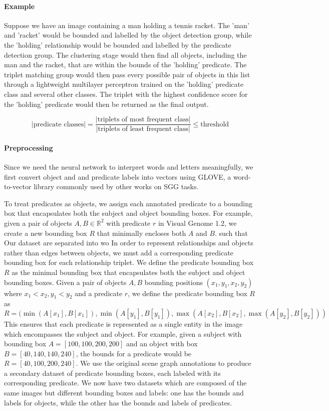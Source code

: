 \documentclass{article}
\begin{document}
\paragraph{Example} Suppose we have an image containing a man holding a tennis racket. The 'man' and 'racket' would be bounded and labelled by the object detection group, while the 'holding' relationship would be bounded and labelled by the predicate detection group. The clustering stage would then find all objects, including the man and the racket, that are within the bounds of the 'holding' predicate. The triplet matching group would then pass every possible pair of objects in this list through a lightweight multilayer perceptron trained on the 'holding' predicate class and several other classes. The triplet with the highest confidence score for the 'holding' predicate would then be returned as the final output.

$$
|\text{predicate classes}| = \frac{|\text{triplets of most frequent class}|}{|\text{triplets of least frequent class}|} \leq \text{threshold}
$$
\paragraph{Preprocessing}
Since we need the neural network to interpret words and letters meaningfully, we first convert object and and predicate labels into vectors using GLOVE\cite{pennington2014glove}, a word-to-vector library commonly used by other works on SGG tasks\cite{lee2018multi}. 

To treat predicates as objects, we assign each annotated predicate to a bounding box that encapsulates both the subject and object bounding boxes. For example, given a pair of objects $A,B \in \mathbb{R}^2$ with predicate $r$ in Visual Genome 1.2, we create a new bounding box $R$ that minimally encloses both $A$ and $B$. such that 
Our dataset are separated into wo
In order to represent relationships and objects rather than edges between objects, we must add a corresponding predicate bounding box for each relationship triplet. We define the predicate bounding box $R$ as the minimal bounding box that encapsulates both the subject and object bounding boxes. Given a pair of objects $A,B$ bounding positions $(x_1,y_1,x_2,y_2)$ where $x_1 < x_2, y_1 < y_2$ and a predicate $r$, we define the predicate bounding box $R$ as
$$
R = (\min(A[x_1],B[x_1]),\min(A[y_1],B[y_1]), \max(A[x_2],B[x_2], \max(A[y_2],B[y_2]))
$$
This ensures that each predicate is represented as a single entity in the image which encompasses the subject and object. For example, given a subject with bounding box $A=[100,100,200,200]$ and an object with box $B=[40,140,140,240]$, the bounds for a predicate would be $R=[40,100,200,240]$.
We use the original scene graph annotations to produce a secondary dataset of predicate bounding boxes, each labeled with its corresponding predicate. We now have two datasets which are composed of the same images but different bounding boxes and labels: one has the bounds and labels for objects, while the other has the bounds and labels of predicates. 
\end{document}

